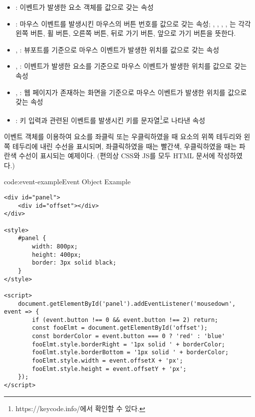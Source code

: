 \begin{itemize}
    \item {}: 이벤트가 발생한 요소 객체를 값으로 갖는 속성
    \item {}: 마우스 이벤트를 발생시킨 마우스의 버튼 번호를 값으로 갖는 속성; , , , , 는 각각 왼쪽 버튼, 휠 버튼, 오른쪽 버튼, 뒤로 가기 버튼, 앞으로 가기 버튼을 뜻한다.
    \item {}, : 뷰포트를 기준으로 마우스 이벤트가 발생한 위치를 값으로 갖는 속성
    \item {}, : 이벤트가 발생한 요소를 기준으로 마우스 이벤트가 발생한 위치를 값으로 갖는 속성
    \item {}, : 웹 페이지가 존재하는 화면을 기준으로 마우스 이벤트가 발생한 위치를 값으로 갖는 속성
    \item {}: 키 입력과 관련된 이벤트를 발생시킨 키를 문자열\footnote{https://keycode.info/에서 확인할 수 있다.}로 나타낸 속성
\end{itemize}

\은 이벤트 객체를 이용하여  요소를 좌클릭 또는 우클릭하였을 때  요소의 위쪽 테두리와 왼쪽 테두리에 내린 수선을 표시되며, 좌클릭하였을 때는 빨간색, 우클릭하였을 때는 파란색 수선이 표시되는 예제이다. (편의상 CSS와 JS를 모두 HTML 문서에 작성하였다.)

\begin{codeenv}{code:event-example}{Event Object Example}\begin{verbatim}
<div id="panel">
    <div id="offset"></div>
</div>

<style>
    #panel {
        width: 800px;
        height: 400px;
        border: 3px solid black;
    }
</style>

<script>
    document.getElementById('panel').addEventListener('mousedown', event => {
        if (event.button !== 0 && event.button !== 2) return;
        const fooElmt = document.getElementById('offset');
        const borderColor = event.button === 0 ? 'red' : 'blue'
        fooElmt.style.borderRight = '1px solid ' + borderColor;
        fooElmt.style.borderBottom = '1px solid ' + borderColor;
        fooElmt.style.width = event.offsetX + 'px';
        fooElmt.style.height = event.offsetY + 'px';
    });
</script>
\end{verbatim}
\end{codeenv}
